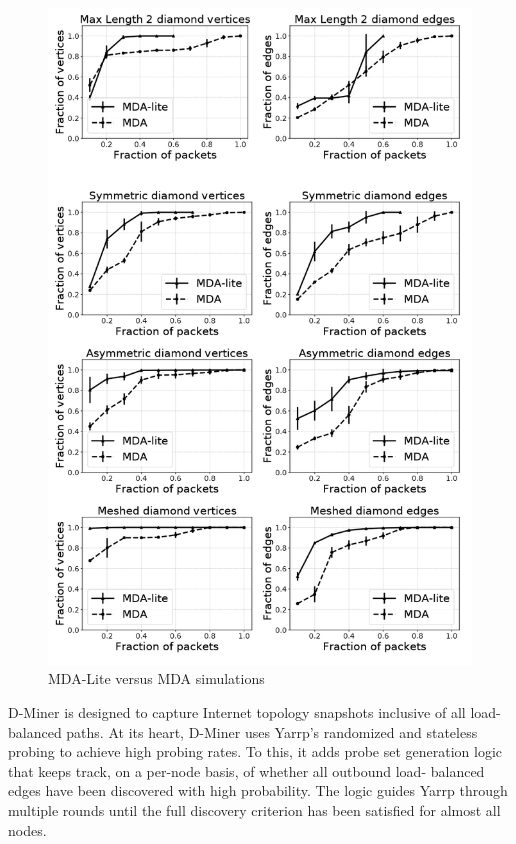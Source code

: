 \begin{figure}[!ht]
  \begin{center}
    \includegraphics[scale=0.3]{images/MDA_lite.png}
    \caption{MDA-Lite versus MDA simulations\cite{MDA-lite}}
    \label{figure:MDA_lite_fig}
  \end{center}
\end{figure}

D-Miner is designed to capture Internet topology snapshots
inclusive of all load-balanced paths. At its heart, D-Miner
uses Yarrp’s randomized and stateless probing to achieve high
probing rates. To this, it adds probe set generation logic that
keeps track, on a per-node basis, of whether all outbound load-
balanced edges have been discovered with high probability.
The logic guides Yarrp through multiple rounds until the full
discovery criterion has been satisfied for almost all nodes. \cite{diamond-miner}

